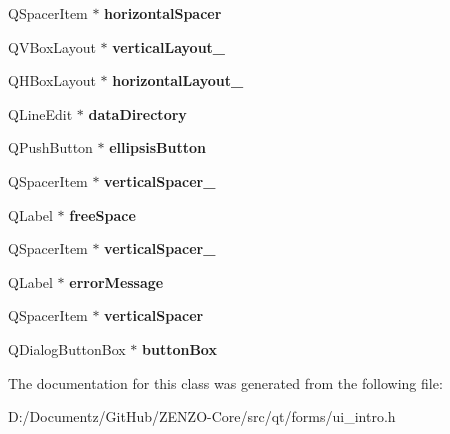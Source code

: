 \begin{DoxyCompactItemize}
Q\+Spacer\+Item $\ast$ {\bfseries horizontal\+Spacer}
\item 
\mbox{\label{class_ui___intro_a22024455855961c50fb5610746462839}} 
Q\+V\+Box\+Layout $\ast$ {\bfseries vertical\+Layout\+\_}
\item 
\mbox{\label{class_ui___intro_a184f3ff90e4f22b2f4d9fc898bc50ac4}} 
Q\+H\+Box\+Layout $\ast$ {\bfseries horizontal\+Layout\+\_}
\item 
\mbox{\label{class_ui___intro_a50b57332ac429001f7feef5e37c4d2c1}} 
Q\+Line\+Edit $\ast$ {\bfseries data\+Directory}
\item 
\mbox{\label{class_ui___intro_a64f14a8a38c1c4d7390040a010998f4a}} 
Q\+Push\+Button $\ast$ {\bfseries ellipsis\+Button}
\item 
\mbox{\label{class_ui___intro_a239cb2bebee42b6eb954281d6da2a80b}} 
Q\+Spacer\+Item $\ast$ {\bfseries vertical\+Spacer\+\_}
\item 
\mbox{\label{class_ui___intro_ad8311ea457abc3ade200a1062971db5e}} 
Q\+Label $\ast$ {\bfseries free\+Space}
\item 
\mbox{\label{class_ui___intro_a4f8943ac5382280a72412d3134f4690c}} 
Q\+Spacer\+Item $\ast$ {\bfseries vertical\+Spacer\+\_}
\item 
\mbox{\label{class_ui___intro_a483f07b3dfbdf0597bcdecd4760bbe9e}} 
Q\+Label $\ast$ {\bfseries error\+Message}
\item 
\mbox{\label{class_ui___intro_a51f53ae5861f2f2636445a4ffb341b68}} 
Q\+Spacer\+Item $\ast$ {\bfseries vertical\+Spacer}
\item 
\mbox{\label{class_ui___intro_a703427426dd08cdc7652046628c4b329}} 
Q\+Dialog\+Button\+Box $\ast$ {\bfseries button\+Box}
\end{DoxyCompactItemize}


The documentation for this class was generated from the following file\+:\begin{DoxyCompactItemize}
\item 
D\+:/\+Documentz/\+Git\+Hub/\+Z\+E\+N\+Z\+O-\/\+Core/src/qt/forms/ui\+\_\+intro.\+h\end{DoxyCompactItemize}
